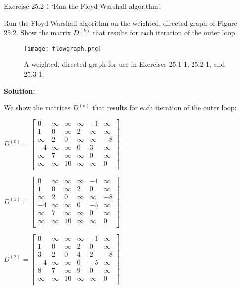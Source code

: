 \documentclass[a4paper, 11pt]{article}
\newcommand{\solution}{\textbf{Solution:}}
\begin{document}
Exercise 25.2-1 `Run the Floyd-Warshall algorithm'.

Run the Floyd-Warshall algorithm on the weighted, directed graph of Figure 25.2. Show the matrix $D^{(k)}$ that results	for each iteration of the outer loop. 

\begin{figure}
	\centering
	\texttt{[image: flowgraph.png]}
	\caption{A weighted, directed graph for use in Exercises 25.1-1, 25.2-1, and 25.3-1. \cite{Cormen:2009:IAT:1614191}}
\end{figure}

\solution

We show the matrices $D^{(k)}$ that results for each iteration of the outer loop:

$D^{(0)} = \begin{bmatrix} 
0 & \infty & \infty & \infty & -1 & \infty\\
1 & 0 & \infty & 2 & \infty & \infty\\
\infty & 2 & 0 & \infty & \infty & -8\\
-4 & \infty & \infty & 0 & 3 & \infty\\
\infty & 7 & \infty & \infty & 0 & \infty\\
\infty & \infty & 10 & \infty & \infty & 0\\
\end{bmatrix}$ 

$D^{(1)} = \begin{bmatrix} 
0 & \infty & \infty & \infty & -1 & \infty\\
1 & 0 & \infty & 2 & 0 & \infty\\
\infty & 2 & 0 & \infty & \infty & -8\\
-4 & \infty & \infty & 0 & -5 & \infty\\
\infty & 7 & \infty & \infty & 0 & \infty\\
\infty & \infty & 10 & \infty & \infty & 0\\
\end{bmatrix}$ 

$D^{(2)} = \begin{bmatrix} 
0 & \infty & \infty & \infty & -1 & \infty\\
1 & 0 & \infty & 2 & 0 & \infty\\
3 & 2 & 0 & 4 & 2 & -8\\
-4 & \infty & \infty & 0 & -5 & \infty\\
8 & 7 & \infty & 9 & 0 & \infty\\
\infty & \infty & 10 & \infty & \infty & 0\\
\end{bmatrix}$ 
\end{document}
